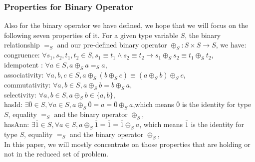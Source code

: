 \documentclass[a4paper,12pt,twoside,openright]{report}
\begin{document}
\subsubsection{Properties for Binary Operator}
Also for the binary operator we have defined, we hope that we will focus on the following seven properties of it.
For a given type variable $S$, the binary relationship $=_S$ and our pre-defined binary operator $\oplus_S: S\times S \rightarrow S$, we have:\\
congruence: $\forall s_1,s_2,t_1,t_2 \in S, s_1 \equiv t_1 \wedge s_2 \equiv t_2 \rightarrow s_1 \oplus_S s_2 \equiv t_1 \oplus_S t_2$,\\
idempotent : $\forall a \in S, a \oplus_S a =_S a$,\\
associativity: $\forall a,b,c \in S, a \oplus_S (b \oplus_S c) \equiv (a \oplus_S b) \oplus_S c$,\\
commutativity: $\forall a,b\in S, a \oplus_S b = b \oplus_S a$,\\
selectivity: $\forall a,b\in S, a \oplus_S b \in \{a,b\}$,\\
hasId: $\exists \bar0 \in S, \forall a \in S, a \oplus_S \bar0 = a = \bar0 \oplus_S a$,which means $\bar0$ is the identity for type $S$, equality $=_S$ and the binary operator $\oplus_S$,\\
hasAnn: $\exists \bar1 \in S, \forall a \in S, a \oplus_S \bar1 = \bar1 = \bar1 \oplus_S a$, which means $\bar1$ is the identity for type $S$, equality $=_S$ and the binary operator $\oplus_S$,\\
In this paper, we will mostly concentrate on those properties that are holding or not in the reduced set of problem. 
\end{document}

